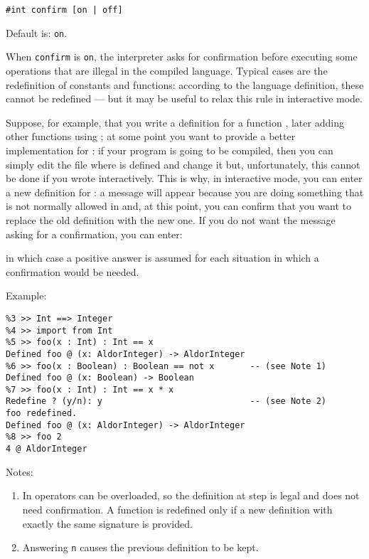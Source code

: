 \mysubsect{} \verb"#int confirm [on | off]"

Default is: \verb"on".


When \verb"confirm" is \verb"on", the interpreter asks for confirmation
before executing some operations that are illegal in the compiled
\asharp{} language. Typical cases are the redefinition of constants and
functions: according to the language definition, these cannot be
redefined --- but it may be useful to relax this rule in interactive
mode.

Suppose, for example, that you write a definition for a function
, later adding other functions using ; at
some point you want to provide a better implementation for
: if your program is going to be compiled, then you can
simply edit the file where  is defined and change it
but, unfortunately, this cannot be done if you wrote 
interactively. This is why, in interactive mode, you can enter a new
definition for : a message will appear because you are
doing something that is not normally allowed in \asharp{} and, at this
point, you can confirm that you want to replace the old definition with
the new one.
If you do not want the message asking for a confirmation, you can enter:


in which case a positive answer is assumed
for each situation in which a confirmation would be needed.

Example:

{\small
\begin{verbatim}
%3 >> Int ==> Integer
%4 >> import from Int
%5 >> foo(x : Int) : Int == x
Defined foo @ (x: AldorInteger) -> AldorInteger
%6 >> foo(x : Boolean) : Boolean == not x       -- (see Note 1)
Defined foo @ (x: Boolean) -> Boolean
%7 >> foo(x : Int) : Int == x * x
Redefine ? (y/n): y                             -- (see Note 2)
foo redefined.
Defined foo @ (x: AldorInteger) -> AldorInteger
%8 >> foo 2
4 @ AldorInteger
\end{verbatim}
}

Notes:
\begin{enumerate}
\item In \asharp{} operators can be overloaded, so the definition at
step  is legal and does not need confirmation.
A function is redefined only if a new definition with exactly the same
signature is provided.
\item Answering \verb"n" causes the previous definition to be kept.
\end{enumerate}

